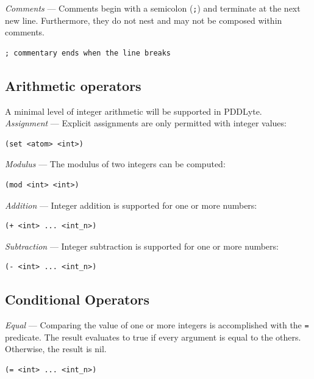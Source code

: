 \documentclass[
a4paper, %
11pt, %
onecolumn, %
openany, %
]{memoir}
\begin{document}
{\setlength{\parindent}{0cm}
\textit{Comments} --- Comments begin with a semicolon (\texttt{;}) and terminate at the next new line. Furthermore, they do not nest and may not be composed within comments.

\begin{lstlisting}
; commentary ends when the line breaks
\end{lstlisting}

\subsection{Arithmetic operators}
A minimal level of integer arithmetic will be supported in PDDLyte. \\

\textit{Assignment} --- Explicit assignments are only permitted with integer values:

\begin{lstlisting}
(set <atom> <int>)
\end{lstlisting}

\textit{Modulus} --- The modulus of two integers can be computed:

\begin{lstlisting}
(mod <int> <int>)
\end{lstlisting}

\textit{Addition} --- Integer addition is supported for one or more numbers:

\begin{lstlisting}
(+ <int> ... <int_n>)
\end{lstlisting}

\textit{Subtraction} --- Integer subtraction is supported for one or more numbers:

\begin{lstlisting}
(- <int> ... <int_n>)
\end{lstlisting}

\subsection{Conditional Operators}

\textit{Equal} --- Comparing the value of one or more integers is accomplished with the \texttt{=} predicate. The result evaluates to true if every argument is equal to the others. Otherwise, the result is nil.

\begin{lstlisting}
(= <int> ... <int_n>)
\end{lstlisting}

}
\end{document}
